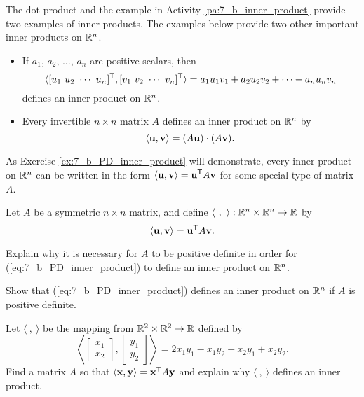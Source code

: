 The dot product and the example in Activity \ref{pa:7_b_inner_product} provide two examples of inner products. The examples below provide two other important inner products on $\mathbb{R}^n$.

\begin{itemize}
\item If $a_1$, $a_2$, $\ldots$, $a_n$ are positive scalars, then 
\[\langle [u_1 \ u_2 \ \cdots \ u_n]^{\tr},  [v_1 \ v_2 \ \cdots \ v_n]^{\tr} \rangle = a_1u_1v_1+a_2u_2v_2+ \cdots + a_nu_nv_n\]
 defines an inner product on $\mathbb{R}^n$. 
\item Every invertible $n \times n$ matrix $A$ defines an inner product on $\mathbb{R}^n$ by  
\[\langle \mathbf{u}, \mathbf{v} \rangle = (A\mathbf{u}) \cdot (A\mathbf{v}).\]
\end{itemize}

As Exercise \ref{ex:7_b_PD_inner_product} will demonstrate, every inner product on $\mathbb{R}^n$ can be written in the form $\langle \mathbf{u}, \mathbf{v} \rangle = \mathbf{u}^{\mathsf{T}} A \mathbf{v}$ for some special type of matrix $A$. 

\begin{activity} Let $A$ be a symmetric $n \times n$ matrix, and define $\langle \ , \ \rangle : \mathbb{R}^n \times \mathbb{R}^n \to \mathbb{R}$ by
    \begin{equation} \label{eq:7_b_PD_inner_product}
    \langle \mathbf{u}, \mathbf{v} \rangle = \mathbf{u}^{\mathsf{T}}A\mathbf{v}.
    \end{equation}
    \ba
    \item Explain why it is necessary for $A$ to be positive definite in order for (\ref{eq:7_b_PD_inner_product}) to define an inner product on $\mathbb{R}^n$.

    \item Show that (\ref{eq:7_b_PD_inner_product}) defines an inner product on $\mathbb{R}^n$ if $A$ is positive definite.

	\item Let $\langle \ , \ \rangle$ be the mapping from $\mathbb{R}^2\times \mathbb{R}^2\to \mathbb{R}$ defined by
\[\left\langle \left[ \begin{array}{c} x_1 \\ x_2 \end{array} \right], \left[ \begin{array}{c} y_1 \\ y_2 \end{array} \right] \right\rangle = 2x_1y_1 - x_1y_2 - x_2y_1 + x_2y_2.\]
Find a matrix $A$ so that $\langle \mathbf{x}, \mathbf{y} \rangle = \mathbf{x}^{\mathsf{T}} A \mathbf{y}$ and explain why $\langle \ , \ \rangle$ defines an inner product. 

    \ea

\end{activity}

